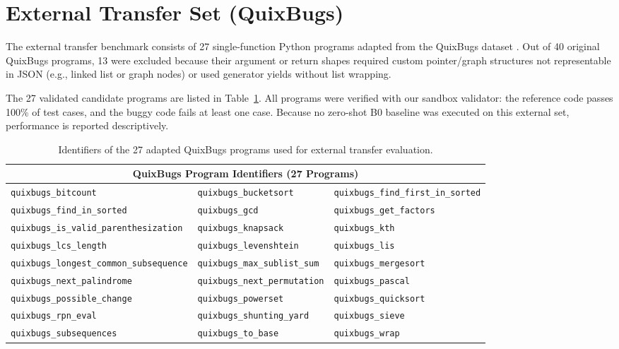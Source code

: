 \documentclass{article}
\begin{document}
\section{External Transfer Set (QuixBugs)}
\label{app:quixbugs}

The external transfer benchmark consists of 27 single-function Python programs adapted from the QuixBugs dataset \cite{Lin2017}. Out of 40 original QuixBugs programs, 13 were excluded because their argument or return shapes required custom pointer/graph structures not representable in JSON (e.g., linked list or graph nodes) or used generator yields without list wrapping. 

The 27 validated candidate programs are listed in Table~\ref{tab:quixbugs_list}. All programs were verified with our sandbox validator: the reference code passes 100\% of test cases, and the buggy code fails at least one case. Because no zero-shot B0 baseline was executed on this external set, performance is reported descriptively.

\begin{table}[h]
\centering
\footnotesize
\begin{tabular}{lll}
\toprule
\multicolumn{3}{c}{\textbf{QuixBugs Program Identifiers (27 Programs)}} \\
\midrule
\texttt{quixbugs\_bitcount} & \texttt{quixbugs\_bucketsort} & \texttt{quixbugs\_find\_first\_in\_sorted} \\
\texttt{quixbugs\_find\_in\_sorted} & \texttt{quixbugs\_gcd} & \texttt{quixbugs\_get\_factors} \\
\texttt{quixbugs\_is\_valid\_parenthesization} & \texttt{quixbugs\_knapsack} & \texttt{quixbugs\_kth} \\
\texttt{quixbugs\_lcs\_length} & \texttt{quixbugs\_levenshtein} & \texttt{quixbugs\_lis} \\
\texttt{quixbugs\_longest\_common\_subsequence} & \texttt{quixbugs\_max\_sublist\_sum} & \texttt{quixbugs\_mergesort} \\
\texttt{quixbugs\_next\_palindrome} & \texttt{quixbugs\_next\_permutation} & \texttt{quixbugs\_pascal} \\
\texttt{quixbugs\_possible\_change} & \texttt{quixbugs\_powerset} & \texttt{quixbugs\_quicksort} \\
\texttt{quixbugs\_rpn\_eval} & \texttt{quixbugs\_shunting\_yard} & \texttt{quixbugs\_sieve} \\
\texttt{quixbugs\_subsequences} & \texttt{quixbugs\_to\_base} & \texttt{quixbugs\_wrap} \\
\bottomrule
\end{tabular}
\caption{Identifiers of the 27 adapted QuixBugs programs used for external transfer evaluation.}
\label{tab:quixbugs_list}
\end{table}
\end{document}
